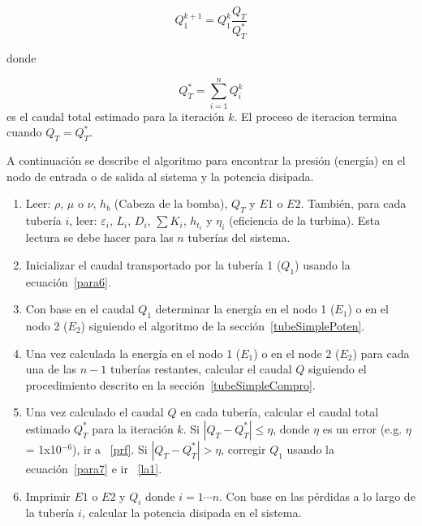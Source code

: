 \documentclass[10pt, oneside]{article}
\begin{document}
\begin{equation}
Q_1^{k+1}= Q_1^k \frac{Q_T}{Q_T^*}
\label{para7}
\end{equation}

donde

\begin{equation}
Q_T^* = \sum_{i=1}^n Q_i^k 
\label{para8}
\end{equation}
es el caudal total estimado para la iteraci\'on $k$. El proceso de iteracion termina cuando $Q_T = Q_T^*$.

A continuaci\'on se describe el algoritmo para encontrar la presi\'on (energ\'ia) en el nodo de entrada o de salida al sistema y la potencia disipada. 

\begin{enumerate}
\item Leer: $\rho$, $\mu$ o $\nu$, $h_{b}$ (Cabeza de la bomba), $Q_T$ y $E1$ o $E2$. Tambi\'en, para cada tuber\'ia $i$, leer: $\varepsilon_i$, $L_i$, $D_i$, $\sum K_i$, $h_{t_i}$ y $\eta_i$ (eficiencia de la turbina). Esta lectura se debe hacer para las $n$ tuber\'ias del sistema.
\item Inicializar el caudal transportado por la tuber\'ia 1 ($Q_1$) usando la ecuaci\'on~\ref{para6}.
\item \label{la1} Con base en el caudal $Q_1$ determinar la energ\'ia en el nodo 1 ($E_1$) o en el nodo 2 ($E_2$) siguiendo el algoritmo de la secci\'on~\ref{tubeSimplePoten}.
\item Una vez calculada la energ\'ia en el nodo 1 ($E_1$) o en el node 2 ($E_2$) para cada una de las $n-1$ tuber\'ias restantes, calcular el caudal $Q$ siguiendo el procedimiento descrito en la secci\'on~\ref{tubeSimpleCompro}.  
\item Una vez calculado el caudal $Q$ en cada tuber\'ia, calcular el caudal total estimado $Q_T^*$ para la iteraci\'on $k$. Si $|Q_T - Q_T^*| \leq \eta$, donde $\eta$ es un error  (e.g. $\eta$ = 1x10$^{-6}$), ir a ~\ref{prf}. Si $|Q_T - Q_T^*| > \eta$, corregir $Q_1$ usando la ecuaci\'on~\ref{para7} e ir ~\ref{la1}.
\item \label{prf} Imprimir $E1$ o $E2$ y $Q_i$ donde $i=1 \cdots n$. Con base en las p\'erdidas a lo largo de la tuber\'ia $i$, calcular la potencia disipada en el sistema.
\end{enumerate}
\end{document}
